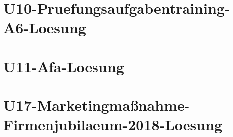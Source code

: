 \chapter{U10-Pruefungsaufgabentraining-A6-Loesung}
%
\chapter{U11-Afa-Loesung}
%
\chapter{U17-Marketingmaßnahme-Firmenjubilaeum-2018-Loesung}
%



%
%



%



